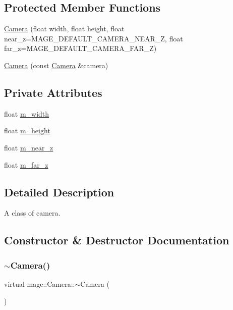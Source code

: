 \subsection*{Protected Member Functions}
\begin{DoxyCompactItemize}
\item 
\hyperlink{classmage_1_1_camera_a64980217b5ae3817affab70eb3e61342}{Camera} (float width, float height, float near\+\_\+z=M\+A\+G\+E\+\_\+\+D\+E\+F\+A\+U\+L\+T\+\_\+\+C\+A\+M\+E\+R\+A\+\_\+\+N\+E\+A\+R\+\_\+Z, float far\+\_\+z=M\+A\+G\+E\+\_\+\+D\+E\+F\+A\+U\+L\+T\+\_\+\+C\+A\+M\+E\+R\+A\+\_\+\+F\+A\+R\+\_\+Z)
\item 
\hyperlink{classmage_1_1_camera_a28d9280bd7067ec4d28392558cc2b767}{Camera} (const \hyperlink{classmage_1_1_camera}{Camera} \&camera)
\end{DoxyCompactItemize}
\subsection*{Private Attributes}
\begin{DoxyCompactItemize}
\item 
float \hyperlink{classmage_1_1_camera_acc8f371214af02fdac9a1ff04508c4ca}{m\+\_\+width}
\item 
float \hyperlink{classmage_1_1_camera_a48485eca596702f0e5985ec8b7db35a5}{m\+\_\+height}
\item 
float \hyperlink{classmage_1_1_camera_a685f8700a29d1f1eff2bec353c3ec970}{m\+\_\+near\+\_\+z}
\item 
float \hyperlink{classmage_1_1_camera_abe2eeca725ce3da238256007454b241f}{m\+\_\+far\+\_\+z}
\end{DoxyCompactItemize}


\subsection{Detailed Description}
A class of camera. 

\subsection{Constructor \& Destructor Documentation}
\hypertarget{classmage_1_1_camera_ae56c0542ae1a480c7fb15d737bf16de0}{}\label{classmage_1_1_camera_ae56c0542ae1a480c7fb15d737bf16de0} 
\subsubsection{\texorpdfstring{$\sim$\+Camera()}{~Camera()}}
{\footnotesize\ttfamily virtual mage\+::\+Camera\+::$\sim$\+Camera (\begin{DoxyParamCaption}{ }\end{DoxyParamCaption})\hspace{0.3cm}{\ttfamily [virtual]}}

